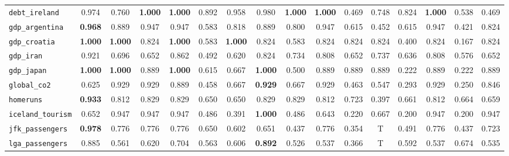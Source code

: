 \begin{table*}[h!]
\begin{adjustbox}{width=\textwidth}
\begin{tabular}{l|c|cccccccccccccc}
    \verb+debt_ireland+ & \cellcolor{orange!01}0.974 & 0.760 & \textbf{1.000} & \textbf{1.000} & 0.892 & 0.958 & 0.980 & \textbf{1.000} & \textbf{1.000} & 0.469 & 0.748 & 0.824 & \textbf{1.000} & 0.538 & 0.469\\
    
    \verb+gdp_argentina+ & \cellcolor{orange!02}\textbf{0.968} & 0.889 & 0.947 & 0.947 & 0.583 & 0.818 & 0.889 & 0.800 & 0.947 & 0.615 & 0.452 & 0.615 & 0.947 & 0.421 & 0.824\\
    
    \verb+gdp_croatia+ & \textbf{1.000} & \textbf{1.000} & 0.824 & \textbf{1.000} & 0.583 & \textbf{1.000} & 0.824 & 0.583 & 0.824 & 0.824 & 0.824 & 0.400 & 0.824 & 0.167 & 0.824\\
    
    \verb+gdp_iran+ & \cellcolor{orange!06}0.921 & 0.696 & 0.652 & 0.862 & 0.492 & 0.620 & 0.824 & 0.734 & 0.808 & 0.652 & 0.737 & 0.636 & 0.808 & 0.576 & 0.652\\
    
    \verb+gdp_japan+ & \textbf{1.000} & \textbf{1.000} & 0.889 & \textbf{1.000} & 0.615 & 0.667 & \textbf{1.000} & 0.500 & 0.889 & 0.889 & 0.889 & 0.222 & 0.889 & 0.222 & 0.889\\
    
    \verb+global_co2+ & \cellcolor{orange!30}0.625 & 0.929 & 0.929 & 0.889 & 0.458 & 0.667 & \textbf{0.929} & 0.667 & 0.929 & 0.463 & 0.547 & 0.293 & 0.929 & 0.250 & 0.846\\
    
    \verb+homeruns+ & \cellcolor{cyan!10}\textbf{0.933} & 0.812 & 0.829 & 0.829 & 0.650 & 0.650 & 0.829 & 0.829 & 0.812 & 0.723 & 0.397 & 0.661 & 0.812 & 0.664 & 0.659\\
    
    \verb+iceland_tourism+ & \cellcolor{orange!40}0.652 & 0.947 & 0.947 & 0.947 & 0.486 & 0.391 & \textbf{1.000} & 0.486 & 0.643 & 0.220 & 0.667 & 0.200 & 0.947 & 0.200 & 0.947\\
    
    \verb+jfk_passengers+ & \cellcolor{cyan!20}\textbf{0.978} & 0.776 & 0.776 & 0.776 & 0.650 & 0.602 & 0.651 & 0.437 & 0.776 & 0.354 & T & 0.491 & 0.776 & 0.437 & 0.723\\
    
    \verb+lga_passengers+ & \cellcolor{orange!01}0.885 & 0.561 & 0.620 & 0.704 & 0.563 & 0.606 & \textbf{0.892} & 0.526 & 0.537 & 0.366 & T & 0.592 & 0.537 & 0.674 & 0.535\\
    

\end{tabular}
\end{adjustbox}
\end{table*}
